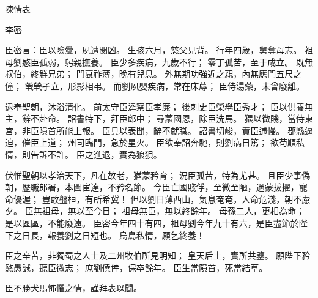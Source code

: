 陳情表

李密

臣密言：臣以險釁，夙遭閔凶。
生孩六月，慈父見背。
行年四歲，舅奪母志。
祖母劉愍臣孤弱，躬親撫養。
臣少多疾病，九歲不行；
零丁孤苦，至于成立。
既無叔伯，終鮮兄弟；
門衰祚薄，晚有兒息。
外無期功強近之親，內無應門五尺之僮；
煢煢孑立，形影相弔。
而劉夙嬰疾病，常在床蓐；
臣侍湯藥，未曾廢離。

逮奉聖朝，沐浴清化。
前太守臣逵察臣孝廉；
後刺史臣榮舉臣秀才；
臣以供養無主，辭不赴命。
詔書特下，拜臣郎中；
尋蒙國恩，除臣洗馬。
猥以微賤，當侍東宮，非臣隕首所能上報。
臣具以表聞，辭不就職。
詔書切峻，責臣逋慢。
郡縣逼迫，催臣上道；
州司臨門，急於星火。
臣欲奉詔奔馳，則劉病日篤；
欲苟順私情，則告訴不許。
臣之進退，實為狼狽。

伏惟聖朝以孝治天下，凡在故老，猶蒙矜育；
況臣孤苦，特為尤甚。
且臣少事偽朝，歷職郎署，本圖宦達，不矜名節。
今臣亡國賤俘，至微至陋，過蒙拔擢，寵命優渥；
豈敢盤桓，有所希冀！
但以劉日薄西山，氣息奄奄，人命危淺，朝不慮夕。
臣無祖母，無以至今日；
祖母無臣，無以終餘年。
母孫二人，更相為命；
是以區區，不能廢遠。
臣密今年四十有四，祖母劉今年九十有六，是臣盡節於陛下之日長，報養劉之日短也。
烏鳥私情，願乞終養！

臣之辛苦，非獨蜀之人士及二州牧伯所見明知；
皇天后土，實所共鑒。
願陛下矜愍愚誠，聽臣微志；
庶劉僥倖，保卒餘年。
臣生當隕首，死當結草。

臣不勝犬馬怖懼之情，謹拜表以聞。